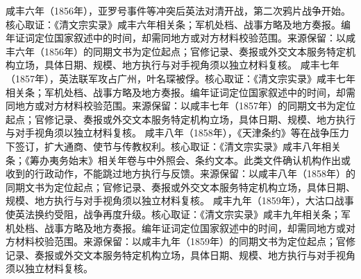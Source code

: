 咸丰六年（1856年），亚罗号事件等冲突后英法对清开战，第二次鸦片战争开始。核心取证：《清文宗实录》咸丰六年相关条；军机处档、战事方略及地方奏报。编年证词定位国家叙述中的时间，却需同地方或对方材料校验范围。来源保留：以咸丰六年（1856年）的同期文书为定位起点；官修记录、奏报或外交文本服务特定机构立场，具体日期、规模、地方执行与对手视角须以独立材料复核。
咸丰七年（1857年），英法联军攻占广州，叶名琛被俘。核心取证：《清文宗实录》咸丰七年相关条；军机处档、战事方略及地方奏报。编年证词定位国家叙述中的时间，却需同地方或对方材料校验范围。来源保留：以咸丰七年（1857年）的同期文书为定位起点；官修记录、奏报或外交文本服务特定机构立场，具体日期、规模、地方执行与对手视角须以独立材料复核。
咸丰八年（1858年），《天津条约》等在战争压力下签订，扩大通商、使节与传教权利。核心取证：《清文宗实录》咸丰八年相关条；《筹办夷务始末》相关年卷与中外照会、条约文本。此类文件确认机构作出或收到的行政动作，不能跳过地方执行与反馈。来源保留：以咸丰八年（1858年）的同期文书为定位起点；官修记录、奏报或外交文本服务特定机构立场，具体日期、规模、地方执行与对手视角须以独立材料复核。
咸丰九年（1859年），大沽口战事使英法换约受阻，战争再度升级。核心取证：《清文宗实录》咸丰九年相关条；军机处档、战事方略及地方奏报。编年证词定位国家叙述中的时间，却需同地方或对方材料校验范围。来源保留：以咸丰九年（1859年）的同期文书为定位起点；官修记录、奏报或外交文本服务特定机构立场，具体日期、规模、地方执行与对手视角须以独立材料复核。
